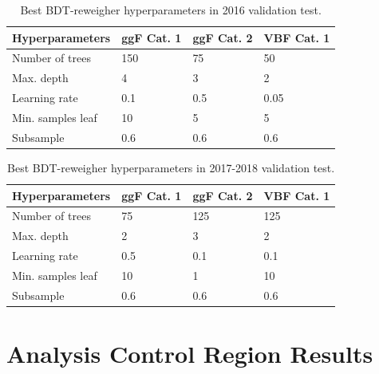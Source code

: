 \begin{table}[htbp!]
\centering
\caption[Best BDT-reweigher hyperparameters in 2016 validation test]{\label{bkg:tab:bdtregparametersval2016}Best BDT-reweigher hyperparameters in 2016 validation test.}
\begin{tabularx}{\textwidth}{lXXX}
    \hline 
    Hyperparameters           & ggF Cat. 1     & ggF Cat. 2    &  VBF Cat. 1 \\
    \hline
    \small Number of trees    & \small  150  & \small 75   & \small  50   \\
    \small Max. depth         & \small  4    & \small  3   & \small  2    \\
    \small Learning rate      & \small 0.1   & \small 0.5  & \small  0.05  \\
    \small Min. samples leaf  & \small 10    & \small 5    & \small 5   \\
    \small Subsample          & \small 0.6   & \small 0.6  & \small 0.6   \\
   \hline
\end{tabularx}
\end{table}

\begin{table}[htbp!]
\centering
\caption[Best BDT-reweigher hyperparameters in 2017-2018 validation test]{\label{bkg:tab:bdtregparametersval20172018}Best BDT-reweigher hyperparameters in 2017-2018 validation test.}
\begin{tabularx}{\textwidth}{lXXX}
    \hline 
    Hyperparameters           & ggF Cat. 1     & ggF Cat. 2    &  VBF  Cat. 1 \\
    \hline
    \small Number of trees    & \small  75   & \small 125  & \small  125   \\
    \small Max. depth         & \small  2    & \small  3   & \small  2    \\
    \small Learning rate      & \small 0.5   & \small  0.1 & \small  0.1  \\
    \small Min. samples leaf  & \small  10   & \small 1    & \small 10   \\
    \small Subsample          & \small 0.6   & \small 0.6  & \small 0.6   \\
    \hline
\end{tabularx}
\end{table}


\clearpage

\section{Analysis Control Region Results}

